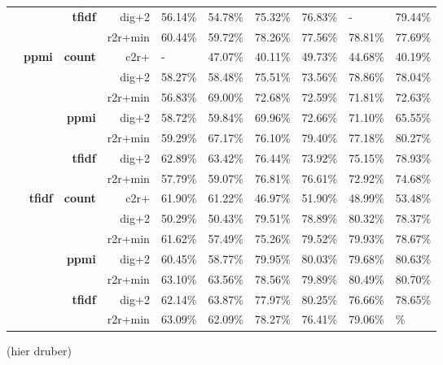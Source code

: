 \begin{table}
{\begin{tabular}{rrrrllllll}
	\cline{3-4}
	 &  & \multirow[t]{2}{*}{\textbf{tfidf}} & {dig+2} & 56.14\% & 54.78\% & 75.32\% & 76.83\% & - & 79.44\% \\
	 &  &  & {r2r+min} & 60.44\% & 59.72\% & 78.26\% & 77.56\% & 78.81\% & 77.69\% \\
	\cline{1-4} \cline{2-4} \cline{3-4}
	\multirow[t]{14}{*}{\textbf{\Smfauhtcsldp}} & \multirow[t]{7}{*}{\textbf{ppmi}} & \multirow[t]{3}{*}{\textbf{count}} & {c2r+} & - & 47.07\% & 40.11\% & 49.73\% & 44.68\% & 40.19\% \\
	 &  &  & {dig+2} & 58.27\% & 58.48\% & 75.51\% & 73.56\% & 78.86\% & 78.04\% \\
	 &  &  & {r2r+min} & 56.83\% & 69.00\% & 72.68\% & 72.59\% & 71.81\% & 72.63\% \\
	\cline{3-4}
	 &  & \multirow[t]{2}{*}{\textbf{ppmi}} & {dig+2} & 58.72\% & 59.84\% & 69.96\% & 72.66\% & 71.10\% & 65.55\% \\
	 &  &  & {r2r+min} & 59.29\% & 67.17\% & 76.10\% & 79.40\% & 77.18\% & 80.27\% \\
	\cline{3-4}
	 &  & \multirow[t]{2}{*}{\textbf{tfidf}} & {dig+2} & 62.89\% & 63.42\% & 76.44\% & 73.92\% & 75.15\% & 78.93\% \\
	 &  &  & {r2r+min} & 57.79\% & 59.07\% & 76.81\% & 76.61\% & 72.92\% & 74.68\% \\
	\cline{2-4} \cline{3-4}
	 & \multirow[t]{7}{*}{\textbf{tfidf}} & \multirow[t]{3}{*}{\textbf{count}} & {c2r+} & 61.90\% & 61.22\% & 46.97\% & 51.90\% & 48.99\% & 53.48\% \\
	 &  &  & {dig+2} & 50.29\% & 50.43\% & 79.51\% & 78.89\% & 80.32\% & 78.37\% \\
	 &  &  & {r2r+min} & 61.62\% & 57.49\% & 75.26\% & 79.52\% & 79.93\% & 78.67\% \\
	\cline{3-4}
	 &  & \multirow[t]{2}{*}{\textbf{ppmi}} & {dig+2} & 60.45\% & 58.77\% & 79.95\% & 80.03\% & 79.68\% & 80.63\% \\
	 &  &  & {r2r+min} & 63.10\% & 63.56\% & 78.56\% & 79.89\% & 80.49\% & 80.70\% \\
	\cline{3-4}
	 &  & \multirow[t]{2}{*}{\textbf{tfidf}} & {dig+2} & 62.14\% & 63.87\% & 77.97\% & 80.25\% & 76.66\% & 78.65\% \\
	 &  &  & {r2r+min} & 63.09\% & 62.09\% & 78.27\% & 76.41\% & 79.06\% & \bst 80.92\% \\
	\bottomrule
	\end{tabular}
	}
\end{table}


 (hier druber)


